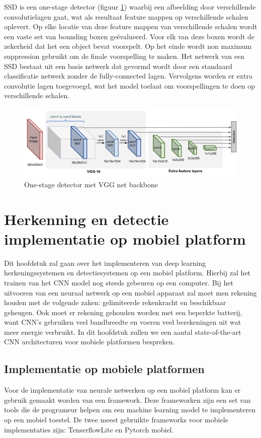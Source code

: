 SSD \cite{liu_ssd_2016} is een one-stage detector (figuur \ref{fig:ssd}) waarbij een afbeelding door verschillende convolutielagen gaat, wat als resultaat feature mappen op verschillende schalen oplevert.
Op elke locatie van deze feature mappen van verschillende schalen wordt een vaste set van bounding boxen ge\"evalueerd.
Voor elk van deze boxen wordt de zekerheid dat het een object bevat voorspelt.
Op het einde wordt non maximum suppression gebruikt om de finale voorspelling te maken.
Het netwerk van een SSD bestaat uit een basis netwerk dat gevormd wordt door een standaard classificatie netwerk zonder de fully-connected lagen.
Vervolgens worden er extra convolutie lagen toegevoegd, wat het model toelaat om voorspellingen te doen op verschillende schalen.

\begin{figure}[!ht]
	\centering
	\includegraphics[width=0.80\linewidth]{fig/SSD.png}
	\caption{One-stage detector met VGG net backbone}
	\label{fig:ssd}
\end{figure}

\chapter{Herkenning en detectie implementatie op mobiel platform}

Dit hoofdstuk zal gaan over het implementeren van deep learning herkeningssystemen en detectiesystemen op een mobiel platform.
Hierbij zal het trainen van het CNN model nog steeds gebeuren op een computer.
Bij het uitvoeren van een neuraal netwerk op een mobiel apparaat zal moet men rekening houden met de volgende zaken: 
gelimiteerde rekenkracht en beschikbaar geheugen.
Ook moet er rekening gehouden worden met een beperkte batterij, want CNN's gebruiken veel bandbreedte en voeren veel berekeningen uit wat meer energie verbruikt.
In dit hoofdstuk zullen we een aantal state-of-the-art CNN architecturen voor mobiele platformen bespreken.

\section{Implementatie op mobiele platformen}
Voor de implementatie van neurale netwerken op een mobiel platform kan er gebruik gemaakt worden van een framework.
Deze frameworken zijn een set van tools die de programeur helpen om een machine learning model te implementeren op een mobiel toestel.
De twee meest gebruikte frameworks voor mobiele implementaties zijn: TenserflowLite en Pytorch mobiel.

